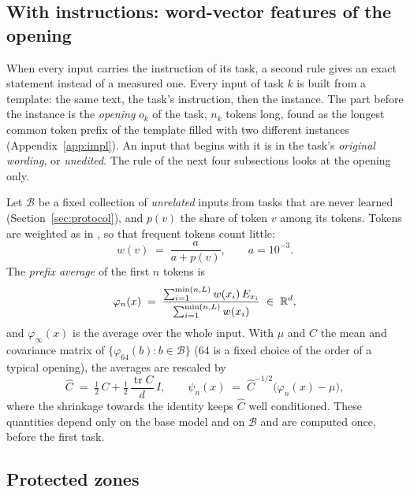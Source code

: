 \subsection{With instructions: word-vector features of the opening}
\label{sec:features}

When every input carries the instruction of its task, a second rule gives an exact statement instead
of a measured one. Every input of task $k$ is built from a template: the same text, the task's
instruction, then the instance. The part before the instance is the \emph{opening} $o_k$ of the task,
$n_k$ tokens long, found as the longest common token prefix of the template filled with two different
instances (Appendix~\ref{app:impl}). An input that begins with it is in the task's \emph{original
wording}, or \emph{unedited}. The rule of the next four subsections looks at the opening only.

Let $\mathcal{B}$ be a fixed collection of \emph{unrelated} inputs from tasks that are never learned
(Section~\ref{sec:protocol}), and $p(v)$ the share of token $v$ among its tokens. Tokens are weighted
as in \citet{arora2017simple}, so that frequent tokens count little:
\begin{equation}
  w(v) \;=\; \frac{a}{a + p(v)} , \qquad a = 10^{-3}.
  \label{eq:weights}
\end{equation}
The \emph{prefix average} of the first $n$ tokens is
\begin{equation}
  \varphi_n(x) \;=\; \frac{\sum_{i=1}^{\min(n, L)} w(x_i)\, E_{x_i}}{\sum_{i=1}^{\min(n, L)} w(x_i)} \;\in\; \mathbb{R}^d ,
  \label{eq:prefix}
\end{equation}
and $\varphi_\infty(x)$ is the average over the whole input. With $\mu$ and $C$ the mean
and covariance matrix of $\{\varphi_{64}(b) : b \in \mathcal{B}\}$ (64 is a fixed choice of the order of a typical opening), the averages are rescaled by
\begin{equation}
  \hat{C} \;=\; \tfrac{1}{2}\, C + \tfrac{1}{2}\, \frac{\operatorname{tr} C}{d}\, I ,
  \qquad
  \psi_n(x) \;=\; \hat{C}^{-1/2} \bigl( \varphi_n(x) - \mu \bigr) ,
  \label{eq:whiten}
\end{equation}
where the shrinkage towards the identity keeps $\hat{C}$ well conditioned. These quantities depend
only on the base model and on $\mathcal{B}$ and are computed once, before the first task.

\subsection{Protected zones}
\label{sec:zones}

